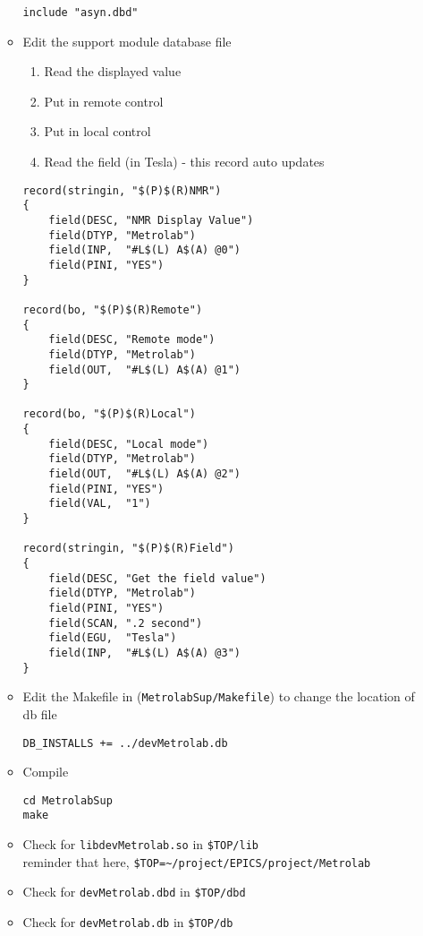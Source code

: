 \documentclass[11pt]{article}
\begin{document}
\begin{enumerate}
\begin{itemize}
\begin{verbatim}
include "asyn.dbd"
\end{verbatim}
\item Edit the support module database file
\begin{enumerate}
\item Read the displayed value
\item Put in remote control
\item Put in local control
\item Read the field (in Tesla) - this record auto updates
\end{enumerate}
\begin{verbatim}
record(stringin, "$(P)$(R)NMR")
{
    field(DESC, "NMR Display Value")
    field(DTYP, "Metrolab")
    field(INP,  "#L$(L) A$(A) @0")
    field(PINI, "YES")
}

record(bo, "$(P)$(R)Remote")
{
    field(DESC, "Remote mode")
    field(DTYP, "Metrolab")
    field(OUT,  "#L$(L) A$(A) @1")
}

record(bo, "$(P)$(R)Local")
{
    field(DESC, "Local mode")
    field(DTYP, "Metrolab")
    field(OUT,  "#L$(L) A$(A) @2")
    field(PINI, "YES")
    field(VAL,  "1")    
}

record(stringin, "$(P)$(R)Field")
{
    field(DESC, "Get the field value")
    field(DTYP, "Metrolab")
    field(PINI, "YES")
    field(SCAN, ".2 second")
    field(EGU,  "Tesla")
    field(INP,  "#L$(L) A$(A) @3")
}
\end{verbatim}
\item Edit the Makefile in (\verb~MetrolabSup/Makefile~) to change the location of db file
\begin{verbatim}
DB_INSTALLS += ../devMetrolab.db
\end{verbatim}
\item Compile
\begin{verbatim}
cd MetrolabSup
make
\end{verbatim}
\item Check for \verb~libdevMetrolab.so~ in \verb~$TOP/lib~\\
      reminder that here, \verb,$TOP=~/project/EPICS/project/Metrolab,
\item Check for \verb~devMetrolab.dbd~ in \verb~$TOP/dbd~
\item Check for \verb~devMetrolab.db~ in \verb~$TOP/db~
\end{itemize}
\end{enumerate}
\end{document}
